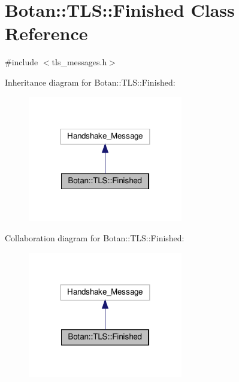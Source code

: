 \hypertarget{class_botan_1_1_t_l_s_1_1_finished}{}\section{Botan\+:\+:T\+LS\+:\+:Finished Class Reference}
\label{class_botan_1_1_t_l_s_1_1_finished}


{\ttfamily \#include $<$tls\+\_\+messages.\+h$>$}



Inheritance diagram for Botan\+:\+:T\+LS\+:\+:Finished\+:
\nopagebreak
\begin{figure}[H]
\begin{center}
\leavevmode
\includegraphics[width=191pt]{class_botan_1_1_t_l_s_1_1_finished__inherit__graph}
\end{center}
\end{figure}


Collaboration diagram for Botan\+:\+:T\+LS\+:\+:Finished\+:
\nopagebreak
\begin{figure}[H]
\begin{center}
\leavevmode
\includegraphics[width=191pt]{class_botan_1_1_t_l_s_1_1_finished__coll__graph}
\end{center}
\end{figure}

